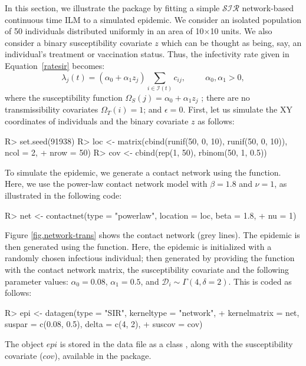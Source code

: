 \documentclass[nojss,shortnames]{jss}
\begin{document}
In this section, we illustrate the  package by fitting a simple $\mathcal{SIR}$ network-based continuous time ILM to a simulated epidemic. We consider an isolated population of 50 individuals distributed uniformly in an area of 10$\times$10 units. We also consider a binary susceptibility covariate $z$ which can be thought as being, say, an individual's treatment or vaccination status. Thus, the infectivity rate given in Equation~\ref{ratesir} becomes: 
\[
\lambda_{j}(t) = (\alpha_{0} + \alpha_{1}z_{j}) \sum_{i \in \mathcal{I}(t)}{c_{ij}}, \hspace{1cm} \alpha_{0}, \alpha_{1}>0,
\]
\noindent where the susceptibility function $\Omega_{S}(j) = \alpha_{0} + \alpha_{1}z_{j}$
; there are no transmissibility covariates $\Omega_{T}(i) = 1$; and $\epsilon = 0$. First, let us simulate the XY coordinates of individuals and the binary covariate $z$ as follows: 
\begin{Sinput}
R> set.seed(91938)
R> loc <- matrix(cbind(runif(50, 0, 10), runif(50, 0, 10)), ncol = 2,
+    nrow = 50)
R> cov <- cbind(rep(1, 50), rbinom(50, 1, 0.5))
\end{Sinput}

To simulate the epidemic, we generate a contact network using the  function. Here, we use the power-law contact network model with $\beta = 1.8$ and $\nu = 1$, as illustrated in the following code: 
\begin{Sinput}
R> net <- contactnet(type = "powerlaw", location = loc, beta = 1.8,
+    nu = 1)
\end{Sinput}
Figure \ref{fig.network-trans} shows the contact network (grey lines).  The epidemic is then generated using the  function. Here, the epidemic is initialized with a randomly chosen infectious individual; then generated by providing the function with the contact network matrix, the susceptibility covariate and the following parameter values: $\alpha_{0} = 0.08$, $\alpha_{1} = 0.5$, and $\mathcal{D}_{i} \sim \Gamma(4,\delta = 2)$. This is coded as follows:

\begin{Sinput}
R> epi <- datagen(type = "SIR", kerneltype = "network", 
+    kernelmatrix = net, suspar = c(0.08, 0.5), delta = c(4, 2), 
+    suscov = cov)
\end{Sinput}

The object $epi$ is stored in the data file  as a class , along with the susceptibility covariate ($cov$), available in the  package.
\end{document}

